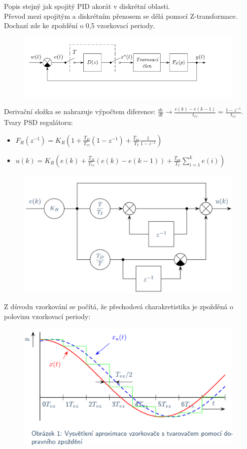 Popis stejný jak spojitý PID akorát v diskrétní oblasti.\\
Převod mezi spojitým a diskrétním přenosem se dělá pomocí Z-transformace. Dochazí zde ke zpoždění o 0,5 vzorkovací periody.
\begin{figure}[H]
    \includegraphics*[scale = 1]{images/PSDVzorkovani.png}
\end{figure}
Derivační složka se nahrazuje výpočtem diference: $\frac{de}{dt} \rightarrow \frac{e(k)-e(k-1)}{t_{vz}} = \frac{1-z^{-1}}{t_{vz}}$.\\
Tvary PSD regulátoru:
\begin{itemize}
    \item $F_R(z^{-1}) = K_R(1+\frac{T_D}{T_{vz}}(1-z^{-1})+\frac{T_{vz}}{T_I}\frac{1}{1-z^{-1}})$
    \item $u(k) = K_R(e(k)+\frac{T_D}{T_{vz}}(e(k)-e(k-1))+\frac{T_{vz}}{T_I}\sum^k_{i=1}e(i))$
\end{itemize}
\begin{figure}[H]
    \centering
    \includegraphics*[scale = 0.3]{images/PSD_regulator.png}
\end{figure}
\newpage

Z důvodu vzorkování se počítá, že přechodová charakretistika je zpožděná o polovinu vzorkovací periody:
\begin{figure}[H]
    \centering
    \includegraphics*[scale = 0.27]{images/PSDVzorkovaniZpozdeni.png}
\end{figure}

